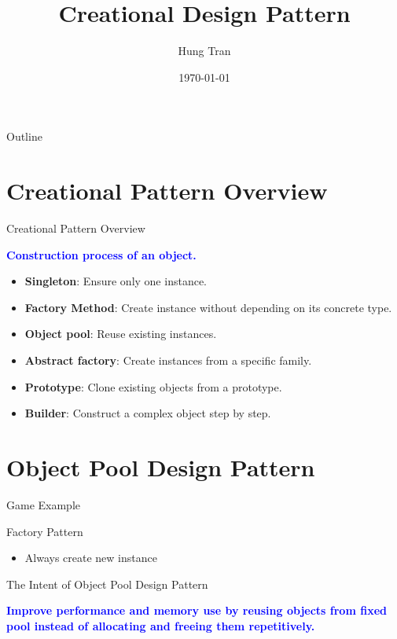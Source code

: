 \documentclass[13pt]{beamer}
\title[Design Pattern]{Creational Design Pattern}
\author{Hung Tran}
\institute{Fpt software}
\date{\today}
\begin{document}
\begin{frame}
  \titlepage
\end{frame}

\begin{frame}{Outline}
  \tableofcontents
\end{frame}

\section{Creational Pattern Overview}

\begin{frame}{Creational Pattern Overview}
	\begin{center}
	\textcolor{blue}{\textbf{Construction process of an object.}}
	\end{center}
	\begin{itemize}
		\setlength\itemsep{1em}
		\item \textbf{Singleton}: Ensure only one instance.
		\item \textbf{Factory Method}: Create instance without depending on its concrete type.
		\item \textbf{Object pool}: Reuse existing instances.
		\item \textbf{Abstract factory}: Create instances from a specific family.
		\item \textbf{Prototype}: Clone existing objects from a prototype.
		\item \textbf{Builder}: Construct a complex object step by step.
	\end{itemize}
\end{frame}

\section{Object Pool Design Pattern}

\begin{frame}{Game Example}
\end{frame}

\begin{frame}{Factory Pattern}
\begin{itemize}
\item Always create new instance
\end{itemize}
\end{frame}

\begin{frame}{The Intent of Object Pool Design Pattern}
	\begin{center}
	\textcolor{blue}{\textbf{Improve performance and memory use by reusing objects from fixed pool instead of allocating and freeing them repetitively.}}
	\end{center}
\end{frame}
\end{document}
